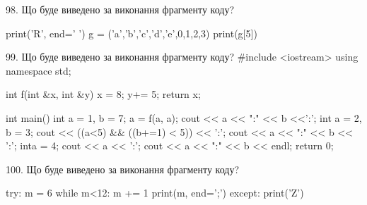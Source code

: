 \documentclass[11pt]{article}
\begin{document}
98. Що буде виведено за виконання фрагменту коду?

print('R', end=' ')
g = ('a','b','c','d','e',0,1,2,3)
print(g[5])



99. Що буде виведено за виконання фрагменту коду?
#include <iostream>
using namespace std;

int f(int &x, int &y){
    x = 8;
    y+= 5;
    return x;
}

int main(){
    int a = 1, b = 7;
    a = f(a, a);
    cout << a << ":" << b <<':';
    {
        int a = 2, b = 3;
        cout << ((a<5) && ((b+=1) < 5)) << ':';
        cout << a << ":" << b << ':';
    }
    {
        inta = 4;
        cout << a << ':';
    }
    cout << a << ":" << b << endl;
    return 0;
}



100. Що буде виведено за виконання фрагменту коду?

try:
    m = 6
    while m<12:
        m += 1
    print(m, end=';')
except:
    print('Z')



\newpage
\end{document}
